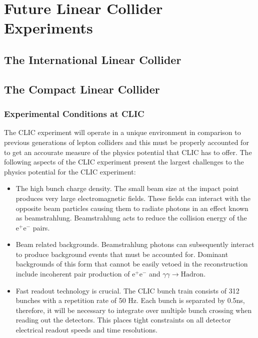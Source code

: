 \chapter{Future Linear Collider Experiments}
\label{chap:futurelinearcolliderexperiments}

\section{The International Linear Collider}

\section{The Compact Linear Collider}

\subsection{Experimental Conditions at CLIC}
The CLIC experiment will operate in a unique environment in comparison to previous generations of lepton colliders and this must be properly accounted for to get an accourate measure of the physics potential that CLIC has to offer.  The following aspects of the CLIC experiment present the largest challenges to the physics potential for the CLIC experiment:

\begin{itemize}
\item The high bunch charge density.  The small beam size at the impact point produces very large electromagnetic fields.  These fields can interact with the opposite beam particles causing them to radiate photons in an effect known as beamstrahlung.  Beamstrahlung acts to reduce the collision energy of the $\text{e}^{+}\text{e}^{-}$ pairs.   
\item Beam related backgrounds.  Beamstrahlung photons can subsequently interact to produce background events that must be accounted for.  Dominant backgrounds of this form that cannot be easily vetoed in the reconstruction include incoherent pair production of $\text{e}^{+}\text{e}^{-}$ and $\gamma\gamma \rightarrow \text{Hadron}$.  
\item Fast readout technology is crucial.  The CLIC bunch train consists of 312 bunches with a repetition rate of 50 Hz.  Each bunch is separated by 0.5ns, therefore, it will be necessary to integrate over multiple bunch crossing when reading out the detectors.  This places tight constraints on all detector electrical readout speeds and time resolutions.   
\end{itemize}


